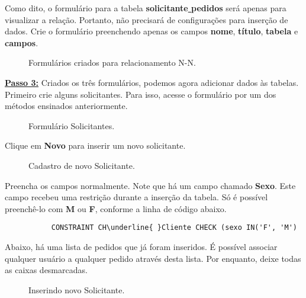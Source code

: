 \documentclass[9pt]{report}
\begin{document}
{       Como dito, o formulário para a tabela
       \textbf{solicitante\underline{ }pedidos} será apenas para
       visualizar a relação. Portanto, não precisará de configurações
       para inserção de dados. Crie o formulário preenchendo apenas
       os campos \textbf{nome}, \textbf{título}, \textbf{tabela} e
       \textbf{campos}.

       \begin{figure}[H]
        \caption{Formulários criados para relacionamento N-N.}
        \label{fig:formsNN}
       \end{figure}

       \underline{\textbf{Passo 3:}} Criados os três formulários,
       podemos agora adicionar dados às tabelas. Primeiro crie alguns
       solicitantes. Para isso, acesse o formulário por um dos
       métodos ensinados anteriormente.

       \begin{figure}[H]
        \caption{Formulário Solicitantes.}
        \label{fig:formsolicit}
       \end{figure}

       Clique em \textbf{Novo} para inserir um novo solicitante.

       \begin{figure}[H]
        \caption{Cadastro de novo Solicitante.}
        \label{fig:formsolicitadd}
       \end{figure}

       Preencha os campos normalmente. Note que há um campo chamado
       \textbf{Sexo}. Este campo recebeu uma restrição durante a
       inserção da tabela. Só é possível preenchê-lo com \textbf{M}
       ou \textbf{F}, conforme a linha de código abaixo.
       
       \begin{lstlisting}        
           CONSTRAINT CH\underline{ }Cliente CHECK (sexo IN('F', 'M')
       \end{lstlisting}

       Abaixo, há uma lista de pedidos que já foram inseridos. É
       possível associar qualquer usuário a qualquer pedido através
       desta lista. Por enquanto, deixe todas as caixas desmarcadas.

       \begin{figure}[H]
        \caption{Inserindo novo Solicitante.}
        \label{fig:formsolicitadddados}
       \end{figure}

}
\end{document}
